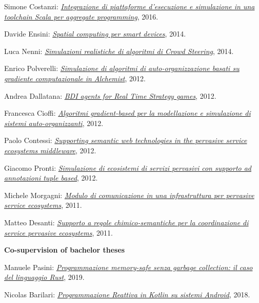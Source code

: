 \begin{outerlist}
\begin{innerlist}
      \item Simone Costanzi: \href{http://amslaurea.unibo.it/10519/}{\textit{Integrazione di piattaforme d'esecuzione e simulazione in una toolchain Scala per aggregate programming}}, 2016.
      \item Davide Ensini: \href{http://amslaurea.unibo.it/7990/}{\textit{Spatial computing per smart devices}}, 2014.
      \item Luca Nenni: \href{http://amslaurea.unibo.it/6927/}{\textit{Simulazioni realistiche di algoritmi di Crowd Steering}}, 2014.
      \item Enrico Polverelli: \href{http://amslaurea.unibo.it/5293/}{\textit{Simulazione di algoritmi di auto-organizzazione basati su gradiente computazionale in Alchemist}}, 2012.
      \item Andrea Dallatana: \href{http://amslaurea.unibo.it/4217/}{\textit{BDI agents for Real Time Strategy games}}, 2012.
      \item Francesca Cioffi: \href{http://amslaurea.unibo.it/4088/}{\textit{Algoritmi gradient-based per la modellazione e simulazione di sistemi auto-organizzanti}}, 2012.
      \item Paolo Contessi: \href{http://amslaurea.unibo.it/4074/}{\textit{Supporting semantic web technologies in the pervasive service ecosystems middleware}}, 2012.
      \item Giacomo Pronti: \href{http://archive.fo/nBeOg}{\textit{Simulazione di ecosistemi di servizi pervasivi con supporto ad annotazioni tuple based}}, 2012.
      \item Michele Morgagni: \href{http://archive.fo/6mnSN}{\textit{Modulo di comunicazione in una infrastruttura per pervasive service ecosystems}}, 2011.
      \item Matteo Desanti: \href{http://archive.fo/rwla1}{\textit{Supporto a regole chimico-semantiche per la coordinazione di service pervasive ecosystems}}, 2011.
    \end{innerlist}
\item[] \textbf{Co-supervision of bachelor theses} %
    \begin{innerlist}
      \item Manuele Pasini: \href{http://amslaurea.unibo.it/18535/}{\textit{Programmazione memory-safe senza garbage collection: il caso del linguaggio Rust}}, 2019.
      \item Nicolas Barilari: \href{http://amslaurea.unibo.it/16841/}{\textit{Programmazione Reattiva in Kotlin su sistemi Android}}, 2018.

\end{innerlist}
\end{outerlist}
